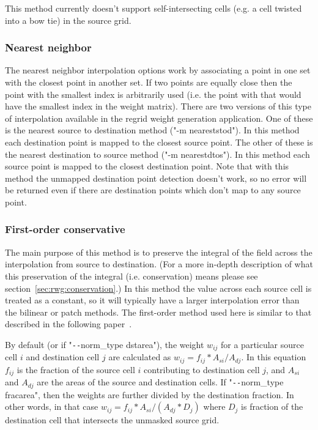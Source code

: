 This method currently doesn't support self-intersecting cells (e.g. a cell twisted into a bow tie) in the source grid.

\subsubsection{Nearest neighbor}\label{sec:rwg_nearest}
The nearest neighbor interpolation options work by associating a point in one set with the closest point in another set. If two points are equally
close then the point with the smallest index is arbitrarily used (i.e. the point with that would have the smallest index in the weight matrix). There are two
versions of this type of interpolation available in the regrid weight generation application. One of these is the nearest source to destination
method ("-m neareststod"). In this method each destination point is mapped to the closest source point. The other of these is the
nearest destination to source method ("-m nearestdtos"). In this method each source point is mapped to the closest destination point. Note
that with this method the unmapped destination point detection doesn't work, so no error will be returned even if there are destination points
which don't map to any source point.

\subsubsection{First-order conservative}\label{sec:rwg_conserve}
 The main purpose of this method is to preserve the integral of the field across the interpolation from source to destination.  
 (For a more in-depth description of what this preservation of the integral (i.e. conservation) means please see section~\ref{sec:rwg:conservation}.)  In this method the value across each source cell is treated as a constant, so it will typically have a larger 
 interpolation error than the bilinear or patch methods.  The first-order method used here is similar to that described in the following paper~\cite{ConservativeOrder1}.

 By default (or if "\verb+--+norm\_type dstarea"), the weight $w_{ij}$ for a particular source cell $i$ and destination cell $j$ are calculated as $w_{ij}=f_{ij} * A_{si}/A_{dj}$. 
In this equation $f_{ij}$ is the fraction of the source cell $i$ contributing to destination cell $j$, and $A_{si}$ and $A_{dj}$ are the areas of the source and 
destination cells. If "\verb+--+norm\_type fracarea", then the weights are further divided by the destination fraction. In other words, in that case $w_{ij}=f_{ij} * A_{si}/(A_{dj}*D_j)$ where $D_j$ is fraction of the destination cell that intersects the unmasked source grid. 

